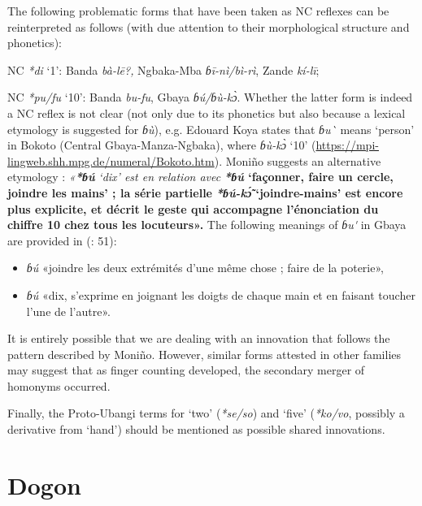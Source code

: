The following problematic forms that have been taken as NC reflexes can be reinterpreted as follows (with due attention to their morphological structure and phonetics):

NC \textit{*di} ‘1’: Banda \textit{bà-l{\={e}}?,} Ngbaka-Mba \textit{ɓ{\={i}}-nì/bì-rì}, Zande \textit{kí-l{\={i}}};

NC \textit{*pu/fu} ‘10’: Banda \textit{bu-fu}, Gbaya \textit{ɓú/ɓù-k{\`{ɔ}}}. Whether the latter form is indeed a NC reflex is not clear (not only due to its phonetics but also because a lexical etymology is suggested for \textit{ɓù}), e.g. Edouard Koya states that \textit{ɓu{\`{}}} means ‘person’ in Bokoto (Central Gbaya-Manza-Ngbaka), where \textit{ɓù-k{\`{ɔ}}} ‘10’ (\url{https://mpi-lingweb.shh.mpg.de/numeral/Bokoto.htm}). Moniño suggests an alternative etymology \citep[656]{Moñino1995}: \textit{«}\textbf{\textit{*ɓú} }\textit{‘dix’ est en relation avec} \textbf{\textit{*ɓú} ‘façonner, faire un cercle, joindre les mains’ ; la série partielle} \textbf{\textit{*ɓú-k{\'{\~ɔ}}} ‘joindre-mains’ est encore plus explicite, et décrit le geste qui accompagne l’énonciation du chiffre 10 chez tous les locuteurs».} The following meanings of \textit{ɓu}\textit{\'{}} in Gbaya are provided in (\citealt{BlanchardNoss1982}: 51): 

\begin{itemize}
 \item  \textit{ɓú}  «joindre les deux extrémités d’une même chose ; faire de la poterie», 
 \item \textit{ɓú} «dix, s’exprime en joignant les doigts de chaque main et en faisant toucher l’une de l’autre». 
\end{itemize}





It is entirely possible that we are dealing with an innovation that follows the pattern described by Moniño. However, similar forms attested in other families may suggest that as finger counting developed, the secondary merger of homonyms occurred.

Finally, the Proto-Ubangi terms for ‘two’ (\textit{*se}\textit{/so}) and ‘five’ (\textit{*ko}\textit{/vo}, possibly a derivative from ‘hand’) should be mentioned as possible shared innovations. 


\section{Dogon}%

